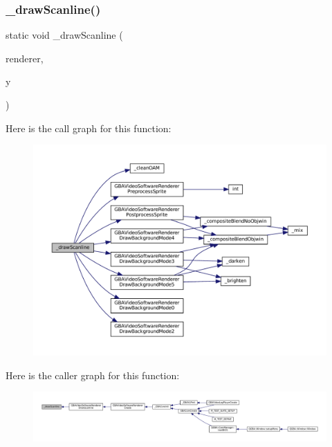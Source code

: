 \subsubsection{\texorpdfstring{\+\_\+draw\+Scanline()}{\_drawScanline()}}
{\footnotesize\ttfamily static void \+\_\+draw\+Scanline (\begin{DoxyParamCaption}\item[{struct G\+B\+A\+Video\+Software\+Renderer $\ast$}]{renderer,  }\item[{\mbox{\hyperlink{ioapi_8h_a787fa3cf048117ba7123753c1e74fcd6}{int}}}]{y }\end{DoxyParamCaption})\hspace{0.3cm}{\ttfamily [static]}}

Here is the call graph for this function\+:
\nopagebreak
\begin{figure}[H]
\begin{center}
\leavevmode
\includegraphics[width=350pt]{video-software_8c_a1bd325c93d45a428fbddba65a83a87e0_cgraph}
\end{center}
\end{figure}
Here is the caller graph for this function\+:
\nopagebreak
\begin{figure}[H]
\begin{center}
\leavevmode
\includegraphics[width=350pt]{video-software_8c_a1bd325c93d45a428fbddba65a83a87e0_icgraph}
\end{center}
\end{figure}
\mbox{\label{video-software_8c_af16bb0ab0d2ab6f5aa0ce3a57c1fd43b}} 
